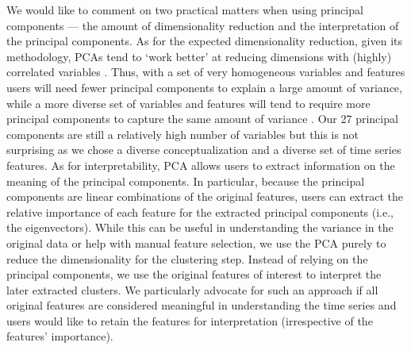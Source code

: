We would like to comment on two practical matters when using principal
components --- the amount of dimensionality reduction and the
interpretation of the principal components. As for the expected
dimensionality reduction, given its methodology, PCAs tend to `work
better' at reducing dimensions with (highly) correlated variables
\citep[e.g.,][]{jolliffe2002}. Thus, with a set of very homogeneous
variables and features users will need fewer principal components to
explain a large amount of variance, while a more diverse set of
variables and features will tend to require more principal components to
capture the same amount of variance \citep[e.g.,][]{abdi2010}. Our 27
principal components are still a relatively high number of variables but
this is not surprising as we chose a diverse conceptualization and a
diverse set of time series features. As for interpretability, PCA allows
users to extract information on the meaning of the principal components.
In particular, because the principal components are linear combinations
of the original features, users can extract the relative importance of
each feature for the extracted principal components (i.e., the
eigenvectors). While this can be useful in understanding the variance in
the original data or help with manual feature selection, we use the PCA
purely to reduce the dimensionality for the clustering step. Instead of
relying on the principal components, we use the original features of
interest to interpret the later extracted clusters. We particularly
advocate for such an approach if all original features are considered
meaningful in understanding the time series and users would like to
retain the features for interpretation (irrespective of the features'
importance).
